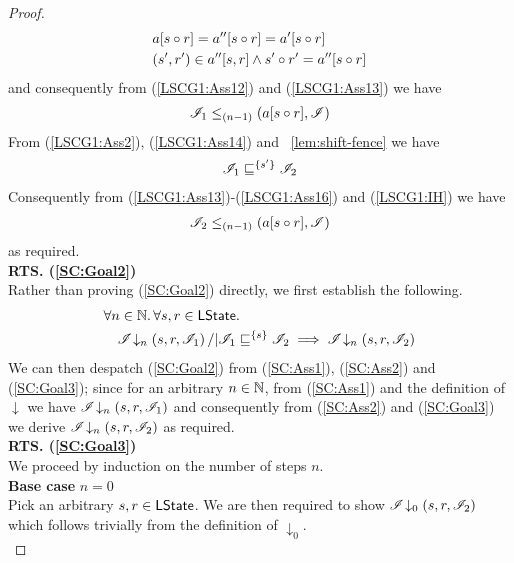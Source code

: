 \begin{lemma}
\begin{proof}
%
\begin{align}
	& a[s \circ r] = a''[s \circ r] = a'[s \circ r] \label{LSCG1:Ass13} \\
	& (s', r') \in a''[s, r] \land  s' \circ r' = a''[s \circ r] \label{LSCG1:Ass14}
\end{align}
%
and consequently from (\ref{LSCG1:Ass12}) and (\ref{LSCG1:Ass13}) we have
%
\begin{align}
	\mathscr{I}_1 \leq_{(n-1)}\left(a[s \circ r], \mathscr{I}\right) \label{LSCG1:Ass15}
\end{align}
%
From (\ref{LSCG1:Ass2}),  (\ref{LSCG1:Ass14}) and \lem~\ref{lem:shift-fence} we have 
%
\begin{align}
	\mathscr{I}_1 \sqsubseteq^{\{s'\}} \mathscr{I}_2 \label{LSCG1:Ass16}
\end{align}
%
Consequently from (\ref{LSCG1:Ass13})-(\ref{LSCG1:Ass16}) and (\ref{LSCG1:IH}) we have
%
\begin{align*}
	\mathscr{I}_2 \leq_{(n-1)}\left(a[s \circ r], \mathscr{I}\right)
\end{align*}
%
as required.\\
%
%
%
%

\noindent\textbf{RTS. (\ref{SC:Goal2})} \\
Rather than proving (\ref{SC:Goal2}) directly, we first establish the following.
%
\begin{align}
	& \forall n \in \mathbb{N}.\, \forall s, r \in \textsf{LState}.\, \nonumber\\
	& \quad \mathscr{I} \!\downarrow_{n} \left(s, r, \mathscr{I}_1\right) /| \mathscr{I}_1 \sqsubseteq^{\{s\}} \mathscr{I}_2 \implies \mathscr{I} \!\downarrow_{n} \left(s, r, \mathscr{I}_2\right) \label{SC:Goal3}
\end{align}
%
We can then despatch (\ref{SC:Goal2}) from (\ref{SC:Ass1}), (\ref{SC:Ass2}) and (\ref{SC:Goal3}); since for an arbitrary $n \in \mathbb{N}$, from (\ref{SC:Ass1}) and the definition of $\downarrow$ we have $\mathscr{I} \!\downarrow_{n} \left(s, r, \mathscr{I}_1\right)$ and consequently from (\ref{SC:Ass2}) and (\ref{SC:Goal3}) we derive $\mathscr{I} \!\downarrow_{n} \left(s, r, \mathscr{I}_2\right) $ as required. \\

\noindent\textbf{RTS. (\ref{SC:Goal3})} \\
We proceed by induction on the number of steps $n$.\\

\noindent\textbf{Base case }$n=0$\\
Pick an arbitrary $s, r \in \textsf{LState}$. We are then required to show	$\mathscr{I} \!\downarrow_{0} \left(s, r, \mathscr{I}_2\right) $ which follows trivially from the definition of $\downarrow_0$.\\



\end{proof}
\end{lemma}
